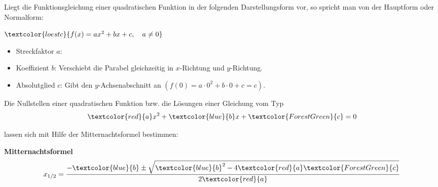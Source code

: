 Liegt die Funktionsgleichung einer quadratischen Funktion in der folgenden Darstellungsform vor, so spricht man von der Hauptform oder Normalform:
\begin{tcolorbox}\centering
	\(\textcolor{loestc}{f(x)=ax^2+bx+c, \quad a\neq 0}\)
\end{tcolorbox}

\begin{itemize}
	\item Streckfaktor \(a\):

    \bigskip

	\item Koeffizient \(b\): \textcolor{loes}{Verschiebt die Parabel gleichzeitig in \(x\)-Richtung und \(y\)-Richtung.}

	\bigskip

	\item Absolutglied \(c\): \textcolor{loes}{Gibt den \(y\)-Achsenabschnitt an \(\left(f(0)=a\cdot 0^2+b\cdot 0+c=c\right)\).}

	\bigskip

\end{itemize}
Die Nullstellen einer quadratischen Funktion bzw. die Lösungen einer Gleichung vom Typ
\[{\textcolor{red}{a}x^2+\textcolor{blue}{b}x+\textcolor{ForestGreen}{c}=0}\]%

lassen sich mit Hilfe der Mitternachtsformel bestimmen:
\begin{tcolorbox}
\textbf{Mitternachtsformel}
\[x_{1/2}=\frac{-\textcolor{blue}{b}\pm\sqrt{\textcolor{blue}{b}^2-4 \textcolor{red}{a}  \textcolor{ForestGreen}{c}}}{2 \textcolor{red}{a}}\]%
\end{tcolorbox}


